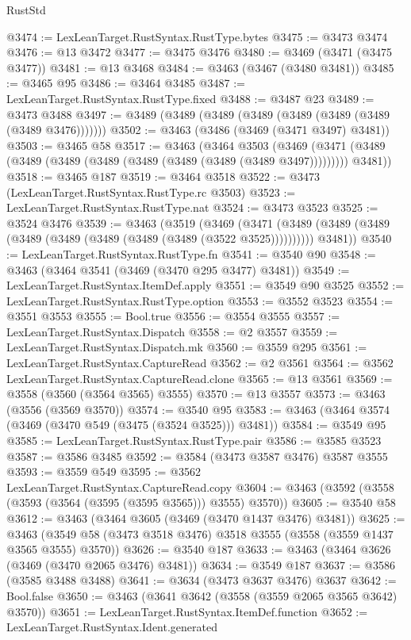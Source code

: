 \begin{lexlean}{RustStd}
\begin{coremodule}
@3474 := LexLeanTarget.RustSyntax.RustType.bytes
@3475 := @3473 @3474
@3476 := @13 @3472
@3477 := @3475 @3476
@3480 := @3469 (@3471 (@3475 @3477))
@3481 := @13 @3468
@3484 := @3463 (@3467 (@3480 @3481))
@3485 := @3465 @95
@3486 := @3464 @3485
@3487 := LexLeanTarget.RustSyntax.RustType.fixed
@3488 := @3487 @23
@3489 := @3473 @3488
@3497 := @3489 (@3489 (@3489 (@3489 (@3489 (@3489 (@3489 (@3489 @3476)))))))
@3502 := @3463 (@3486 (@3469 (@3471 @3497) @3481))
@3503 := @3465 @58
@3517 := @3463
    (@3464
      @3503
      (@3469 (@3471 (@3489 (@3489 (@3489 (@3489 (@3489 (@3489 (@3489 (@3489 @3497))))))))) @3481))
@3518 := @3465 @187
@3519 := @3464 @3518
@3522 := @3473 (LexLeanTarget.RustSyntax.RustType.rc @3503)
@3523 := LexLeanTarget.RustSyntax.RustType.nat
@3524 := @3473 @3523
@3525 := @3524 @3476
@3539 := @3463
    (@3519
      (@3469
        (@3471 (@3489 (@3489 (@3489 (@3489 (@3489 (@3489 (@3489 (@3489 (@3522 @3525))))))))))
        @3481))
@3540 := LexLeanTarget.RustSyntax.RustType.fn
@3541 := @3540 @90
@3548 := @3463 (@3464 @3541 (@3469 (@3470 @295 @3477) @3481))
@3549 := LexLeanTarget.RustSyntax.ItemDef.apply
@3551 := @3549 @90 @3525
@3552 := LexLeanTarget.RustSyntax.RustType.option
@3553 := @3552 @3523
@3554 := @3551 @3553
@3555 := Bool.true
@3556 := @3554 @3555
@3557 := LexLeanTarget.RustSyntax.Dispatch
@3558 := @2 @3557
@3559 := LexLeanTarget.RustSyntax.Dispatch.mk
@3560 := @3559 @295
@3561 := LexLeanTarget.RustSyntax.CaptureRead
@3562 := @2 @3561
@3564 := @3562 LexLeanTarget.RustSyntax.CaptureRead.clone
@3565 := @13 @3561
@3569 := @3558 (@3560 (@3564 @3565) @3555)
@3570 := @13 @3557
@3573 := @3463 (@3556 (@3569 @3570))
@3574 := @3540 @95
@3583 := @3463 (@3464 @3574 (@3469 (@3470 @549 (@3475 (@3524 @3525))) @3481))
@3584 := @3549 @95
@3585 := LexLeanTarget.RustSyntax.RustType.pair
@3586 := @3585 @3523
@3587 := @3586 @3485
@3592 := @3584 (@3473 @3587 @3476) @3587 @3555
@3593 := @3559 @549
@3595 := @3562 LexLeanTarget.RustSyntax.CaptureRead.copy
@3604 := @3463 (@3592 (@3558 (@3593 (@3564 (@3595 (@3595 @3565))) @3555) @3570))
@3605 := @3540 @58
@3612 := @3463 (@3464 @3605 (@3469 (@3470 @1437 @3476) @3481))
@3625 := @3463 (@3549 @58 (@3473 @3518 @3476) @3518 @3555 (@3558 (@3559 @1437 @3565 @3555) @3570))
@3626 := @3540 @187
@3633 := @3463 (@3464 @3626 (@3469 (@3470 @2065 @3476) @3481))
@3634 := @3549 @187
@3637 := @3586 (@3585 @3488 @3488)
@3641 := @3634 (@3473 @3637 @3476) @3637
@3642 := Bool.false
@3650 := @3463 (@3641 @3642 (@3558 (@3559 @2065 @3565 @3642) @3570))
@3651 := LexLeanTarget.RustSyntax.ItemDef.function
@3652 := LexLeanTarget.RustSyntax.Ident.generated

\end{coremodule}
\end{lexlean}
